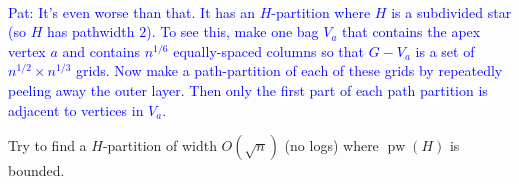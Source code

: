 \documentclass{patmorin}
\newcommand{\david}[1]{{\color{orange} David: #1}}
\newcommand{\pat}[1]{\textcolor{Blue}{Pat: #1}}
\DeclareMathOperator{\pw}{pw}
\DeclareMathOperator{\td}{td}
\begin{document}
{\begin{compactenum}
{   } \\[2ex]
   \pat{It's even worse than that.  It has an $H$-partition where $H$ is a subdivided star (so $H$ has pathwidth $2$).  To see this, make one bag $V_a$ that contains the apex vertex $a$ and contains $n^{1/6}$ equally-spaced columns so that $G-V_a$ is a set of $n^{1/2}\times n^{1/3}$ grids.  Now make a path-partition of each of these grids by repeatedly peeling away the outer layer.  Then only the first part of each path partition is adjacent to vertices in $V_a$.}
  \item Try to find a $H$-partition of width $O(\sqrt{n})$ (no logs) where $\pw(H)$ is bounded.
  \end{compactenum}
}




\end{document}
